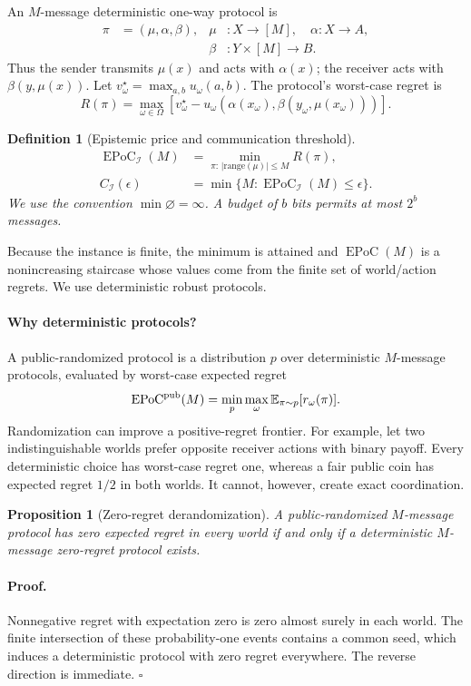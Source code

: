 \documentclass[letterpaper]{article} %
\newtheorem{proposition}[theorem]{Proposition}
\newtheorem{definition}[theorem]{Definition}
\newcommand{\EPoC}{\operatorname{EPoC}}
\newcommand{\Ceps}{C}
\newcommand{\I}{\mathcal{I}}
\begin{document}
An $M$-message deterministic one-way protocol is
\begin{align*}
\pi&=(\mu,\alpha,\beta), & \mu&:X\to[M],\quad \alpha:X\to A,\\
&&\beta&:Y\times[M]\to B.
\end{align*}
Thus the sender transmits $\mu(x)$ and acts with $\alpha(x)$; the receiver acts
with $\beta(y,\mu(x))$. Let
$v_\omega^\star=\max_{a,b}u_\omega(a,b)$. The protocol's worst-case regret is
\[
R(\pi)=\max_{\omega\in\Omega}
\left[v_\omega^\star-u_\omega\!\left(
\alpha(x_\omega),\beta(y_\omega,\mu(x_\omega))\right)\right].
\]

\begin{definition}[Epistemic price and communication threshold]
\begin{align*}
\EPoC_\I(M)&=\min_{\pi:\,|\mathrm{range}(\mu)|\le M}R(\pi),\\
\Ceps_\I(\epsilon)&=\min\{M:\EPoC_\I(M)\le\epsilon\}.
\end{align*}
We use the convention $\min\varnothing=\infty$. A budget of $b$ bits permits
at most $2^b$ messages.
\end{definition}

Because the instance is finite, the minimum is attained and $\EPoC(M)$ is a
nonincreasing staircase whose values come from the finite set of world/action
regrets. We use deterministic robust protocols.

\paragraph{Why deterministic protocols?}
A public-randomized protocol is a distribution $p$ over deterministic
$M$-message protocols, evaluated by worst-case expected regret
\[
\EPoC^{\rm pub}(M)=
\min_{p}\max_{\omega}\mathbb E_{\pi\sim p}[r_\omega(\pi)].
\]
Randomization can improve a positive-regret frontier. For example, let two
indistinguishable worlds prefer opposite receiver actions with binary payoff.
Every deterministic choice has worst-case regret one, whereas a fair public
coin has expected regret $1/2$ in both worlds. It cannot, however, create exact
coordination.

\begin{proposition}[Zero-regret derandomization]\label{prop:derandomize}
A public-randomized $M$-message protocol has zero expected regret in every world
if and only if a deterministic $M$-message zero-regret protocol exists.
\end{proposition}
\paragraph{Proof.}
Nonnegative regret with expectation zero is zero almost surely in each world.
The finite intersection of these probability-one events contains a common seed,
which induces a deterministic protocol with zero regret everywhere. The reverse
direction is immediate. \hfill$\square$
\end{document}

